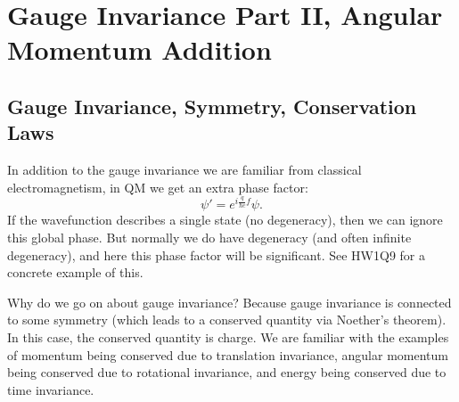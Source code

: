 \section{Gauge Invariance Part II, Angular Momentum Addition}
\subsection{Gauge Invariance, Symmetry, Conservation Laws}
In addition to the gauge invariance we are familiar from classical electromagnetism, in QM we get an extra phase factor:
\begin{equation}
    \psi' = e^{i\frac{q}{\hbar c}f}\psi.
\end{equation}
If the wavefunction describes a single state (no degeneracy), then we can ignore this global phase. But normally we do have degeneracy (and often infinite degeneracy), and here this phase factor will be significant. See HW1Q9 for a concrete example of this.

Why do we go on about gauge invariance? Because gauge invariance is connected to some symmetry (which leads to a conserved quantity via Noether's theorem). In this case, the conserved quantity is charge. We are familiar with the examples of momentum being conserved due to translation invariance, angular momentum being conserved due to rotational invariance, and energy being conserved due to time invariance. 

